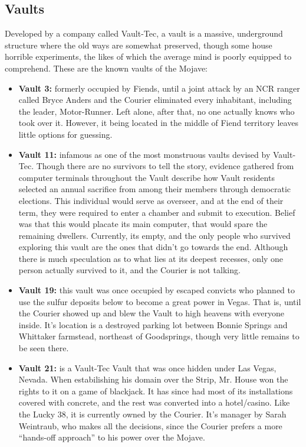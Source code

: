 \documentclass[11pt]{article} %
\begin{document}
\subsection{Vaults}

Developed by a company called Vault-Tec, a vault is a massive, underground structure where the old ways are somewhat preserved, though some house horrible experiments, the likes of which the average mind is poorly equipped to comprehend. These are the known vaults of the Mojave:

\begin{itemize}
	\item \textbf{Vault 3:} formerly occupied by Fiends, until a joint attack by an NCR ranger called Bryce Anders and the Courier eliminated every inhabitant, including the leader, Motor-Runner. Left alone, after that, no one actually knows who took over it. However, it being located in the middle of Fiend territory leaves little options for guessing.
	
	\item \textbf{Vault 11:} infamous as one of the most monstruous vaults devised by Vault-Tec. Though there are no survivors to tell the story, evidence gathered from computer terminals throughout the Vault describe how Vault residents selected an annual sacrifice from among their members through democratic elections. This individual would serve as overseer, and at the end of their term, they were required to enter a chamber and submit to execution. Belief was that this would placate its main computer, that would spare the remaining dwellers. Currently, its empty, and the only people who survived exploring this vault are the ones that didn't go towards the end. Although there is much speculation as to what lies at its deepest recesses, only one person actually survived to it, and the Courier is not talking.
	
	\item \textbf{Vault 19:} this vault was once occupied by escaped convicts who planned to use the sulfur deposits below to become a great power in Vegas. That is, until the Courier showed up and blew the Vault to high heavens with everyone inside. It's location is a destroyed parking lot between Bonnie Springs and Whittaker farmstead, northeast of Goodsprings, though very little remains to be seen there.
	
	\item \textbf{Vault 21:} is a Vault-Tec Vault that was once hidden under Las Vegas, Nevada. When estabilishing his domain over the Strip, Mr. House won the rights to it on a game of blackjack. It has since had most of its installations covered with concrete, and the rest was converted into a hotel/casino. Like the Lucky 38, it is currently owned by the Courier. It's manager by Sarah Weintraub, who makes all the decisions, since the Courier prefers a more ``hands-off approach'' to his power over the Mojave.
	

\end{itemize}
\end{document}
